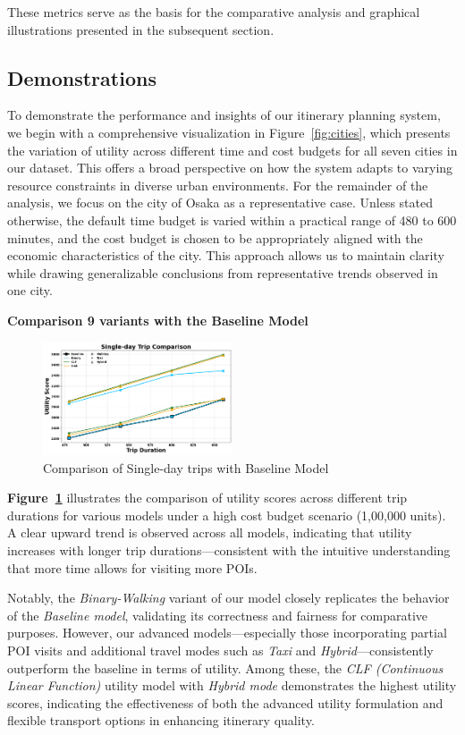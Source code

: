 
These metrics serve as the basis for the comparative analysis and graphical illustrations presented in the subsequent section.

\subsection{Demonstrations}

To demonstrate the performance and insights of our itinerary planning system, we begin with a comprehensive visualization in Figure~\ref{fig:cities}, which presents the variation of utility across different time and cost budgets for all seven cities in our dataset. This offers a broad perspective on how the system adapts to varying resource constraints in diverse urban environments. For the remainder of the analysis, we focus on the city of Osaka as a representative case. Unless stated otherwise, the default time budget is varied within a practical range of 480 to 600 minutes, and the cost budget is chosen to be appropriately aligned with the economic characteristics of the city. This approach allows us to maintain clarity while drawing generalizable conclusions from representative trends observed in one city.

\newpage
\noindent \textbf{Comparison 9 variants with the Baseline Model}
\begin{figure}[th]
\centering
\includegraphics[width=0.5\textwidth]{plots/singledaycomparison.png}
\caption{Comparison of Single-day trips with Baseline Model}
\label{fig:comparisonWithBaselinePlot_singleday}
\end{figure}
\noindent
\textbf{Figure~\ref{fig:comparisonWithBaselinePlot_singleday}} illustrates the comparison of utility scores across different trip durations for various models under a high cost budget scenario (1,00,000 units). A clear upward trend is observed across all models, indicating that utility increases with longer trip durations—consistent with the intuitive understanding that more time allows for visiting more POIs.

Notably, the \textit{Binary-Walking} variant of our model closely replicates the behavior of the \textit{Baseline model}, validating its correctness and fairness for comparative purposes. However, our advanced models—especially those incorporating partial POI visits and additional travel modes such as \textit{Taxi} and \textit{Hybrid}—consistently outperform the baseline in terms of utility. Among these, the \textit{CLF (Continuous Linear Function)} utility model with \textit{Hybrid mode} demonstrates the highest utility scores, indicating the effectiveness of both the advanced utility formulation and flexible transport options in enhancing itinerary quality.

